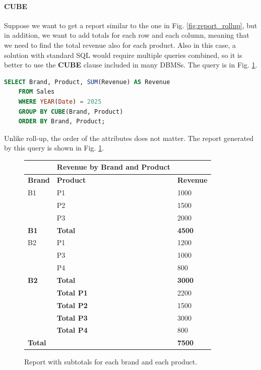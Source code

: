 \paragraph{CUBE}
Suppose we want to get a report similar to the one in Fig. \ref{fig:report_rollup}, but in addition, we want to add totals for each row and each column, meaning that we need to find the total revenue also for each product. Also in this case, a solution with standard SQL would require multiple queries combined, so it is better to use the \textbf{CUBE} clause included in many DBMSs. The query is in Fig. \ref{fig:report_cube}.
\begin{lstlisting}[language=SQL]
    SELECT Brand, Product, SUM(Revenue) AS Revenue
    FROM Sales
    WHERE YEAR(Date) = 2025
    GROUP BY CUBE(Brand, Product)
    ORDER BY Brand, Product;
\end{lstlisting}
Unlike roll-up, the order of the attributes does not matter. The report generated by this query is shown in Fig. \ref{fig:report_cube}.
\begin{figure}[H]
    \centering
    \begin{tabular}{lll}
        \hline
        & \textbf{Revenue by Brand and Product} & \\
        \hline
        \textbf{Brand} & \textbf{Product} & \textbf{Revenue} \\
        \hline
        B1 & P1 & 1000 \\
        & P2 & 1500 \\
        & P3 & 2000 \\
        \textbf{B1} & \textbf{Total} & \textbf{4500} \\
        B2 & P1 & 1200 \\
        & P3 & 1000 \\
        & P4 & 800 \\
        \textbf{B2} & \textbf{Total} & \textbf{3000} \\
        & \textbf{Total P1} & 2200 \\
        & \textbf{Total P2} & 1500 \\
        & \textbf{Total P3} & 3000 \\
        & \textbf{Total P4} & 800 \\
        \textbf{Total} & & \textbf{7500} \\
        \hline
    \end{tabular}
    \caption{Report with subtotals for each brand and each product.}
    \label{fig:report_cube}
\end{figure}

